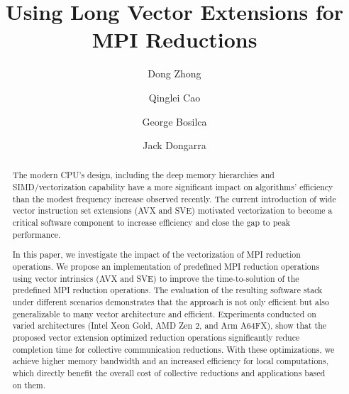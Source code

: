 \documentclass[5p,times,twocolumn]{elsarticle}
\begin{document}
\title{Using Long Vector Extensions for MPI Reductions}

\author[First]{Dong Zhong}

\author[First]{Qinglei Cao}

\author[First]{George Bosilca}

\author[First]{Jack Dongarra}

\address[First]{The University of Tennessee, 1122 Volunteer Blvd, Knoxville, TN 37996}

\begin{abstract}
  The modern CPU's design, including the deep memory hierarchies and
  SIMD/vectorization capability have a more significant impact on algorithms' efficiency than
  the modest frequency increase observed recently. The current
  introduction of wide vector instruction set extensions (AVX and SVE) motivated
  vectorization to become a critical software component to increase efficiency and
  close the gap to peak performance.

  In this paper, we investigate the impact of the vectorization of MPI reduction
  operations. We propose an implementation of predefined MPI reduction
  operations using vector intrinsics (AVX and SVE) to improve the
  time-to-solution of the predefined MPI reduction operations.
  The evaluation of the resulting software stack under different scenarios
  demonstrates that the approach is not only efficient but also generalizable to many vector architecture and efficient.  Experiments
  conducted on varied architectures (Intel Xeon Gold, AMD Zen 2, and Arm
  A64FX), show that the proposed vector extension optimized reduction operations
  significantly reduce completion time for collective communication reductions.
  With these optimizations, we achieve higher memory bandwidth and an increased
  efficiency for local computations, which directly benefit the overall cost of
  collective reductions and applications based on them.


\end{abstract}
\end{document}

